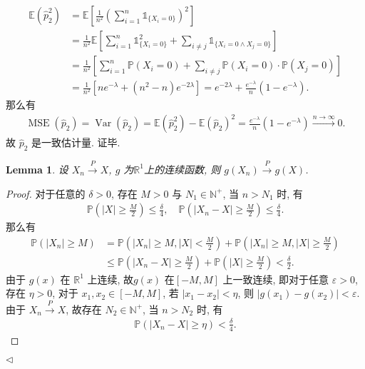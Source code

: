 \documentclass[11pt]{article}
\newtheorem{lemma}[theorem]{Lemma}
\newenvironment{answer}[1][Solution]{\begin{trivlist}
    \item[\hskip \labelsep {\bfseries #1.}\hskip \labelsep]}{\hfill$\lhd$\end{trivlist}}
\newcommand\1{\mathds{1}}
\newcommand\R{\mathbb{R}}
\newcommand\E{\mathbb{E}}
\newcommand\N{\mathbb{N}}
\newcommand\PP{\mathbb{P}}
\newcommand{\arrp}{\xrightarrow{P}}
\newcommand{\arri}{\xrightarrow{n\rightarrow\infty}}
\DeclareMathOperator{\Var}{Var}
\DeclareMathOperator{\MSE}{MSE}
\begin{document}
\begin{answer}
\begin{enumerate}[label=(\arabic*)]
        \begin{align*}
            \E\left(\hat{p}_2^2\right) &= \E\left[\frac{1}{n^2}\left(\sum_{i=1}^{n} \1_{\{X_i=0\}}\right)^2\right]  \\
            &= \frac{1}{n^2} \E\left[\sum_{i=1}^{n}\1_{\{X_i=0\}}^2 + \sum_{i\neq j} \1_{\{X_i = 0 \land X_j = 0\}}\right] \\
            &= \frac{1}{n^2} \left[\sum_{i=1}^{n}\PP(X_i = 0) + \sum_{i\neq j} \PP(X_i=0) \cdot \PP(X_j =0)\right] \\
            &= \frac{1}{n^2} \left[n e^{-\lambda} + (n^2 - n) e^{-2\lambda}\right] = e^{-2\lambda} + \frac{e^{-\lambda}}{n}(1 - e^{-\lambda}).
        \end{align*}
        那么有
        \begin{align*}
            \MSE(\hat{p}_2) = \Var(\hat{p}_2) = \E\left(\hat{p}_2^2\right) - \E\left(\hat{p}_2\right)^2 = \frac{e^{-\lambda}}{n} (1 - e^{-\lambda}) \arri 0.
        \end{align*}
        故 $\hat{p}_2$ 是一致估计量. 证毕.
    \end{enumerate}
    \begin{lemma}
        \label{lemma:1}
        设 $X_n \arrp X$, $g$ 为$\R^1$上的连续函数, 则 $g(X_n) \arrp g(X)$.
    \end{lemma}
    \begin{proof}
        对于任意的 $\delta > 0$, 存在 $M > 0$ 与 $N_1 \in \N^+$, 当 $n > N_1$ 时, 有 
        \begin{align*}
            \PP\left(|X| \ge \frac{M}{2}\right) \le \frac{\delta}{4}, \quad\PP\left(|X_n - X| \ge \frac{M}{2}\right) \le \frac{\delta}{4}.
        \end{align*}
        那么有
        \begin{align*}
            \PP(|X_n| \ge M) &= \PP\left(|X_n| \ge M, |X| < \frac{M}{2}\right) + \PP\left(|X_n| \ge M, |X| \ge \frac{M}{2}\right) \\
            &\le \PP\left(|X_n - X| \ge \frac{M}{2}\right) + \PP\left(|X|\ge \frac{M}{2}\right) < \frac{\delta}{2}.
        \end{align*}
        由于 $g(x)$ 在 $\R^1$ 上连续, 故$g(x)$ 在$[-M, M]$ 上一致连续, 即对于任意 $\varepsilon > 0$, 存在 $\eta >0$, 对于 $x_1, x_2 \in [-M, M]$, 
        若 $|x_1 - x_2| < \eta$, 则 $|g(x_1) - g(x_2)| < \varepsilon$. 由于 $X_n \arrp X$, 故存在 $N_2 \in \N^+$, 当 $n > N_2$ 时, 有
        \begin{align*}
            \PP(|X_n - X| \ge \eta) < \frac{\delta}{4}.
        \end{align*}

\end{proof}
\end{answer}
\end{document}
